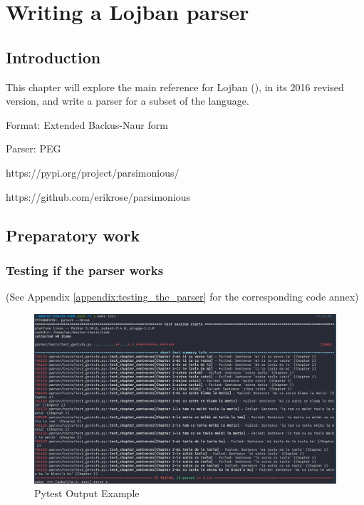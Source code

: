 \chapter{Writing a Lojban parser}

\section{Introduction}

This chapter will explore the main reference for Lojban (\cite{cowan1997complete}), in its 2016 revised version, and write a parser for a subset of the language.

Format: Extended Backus-Naur form

Parser: PEG

https://pypi.org/project/parsimonious/

https://github.com/erikrose/parsimonious

\section{Preparatory work}

\subsection{Testing if the parser works}
\label{sub:testing_if_the_parser_works}

(See Appendix \ref{appendix:testing_the_parser} for the corresponding code annex)

\begin{figure}[H]
\hspace{-2cm}
\includegraphics[scale=0.43]{images/pytest_output.png}
\caption{Pytest Output Example}
\end{figure}
